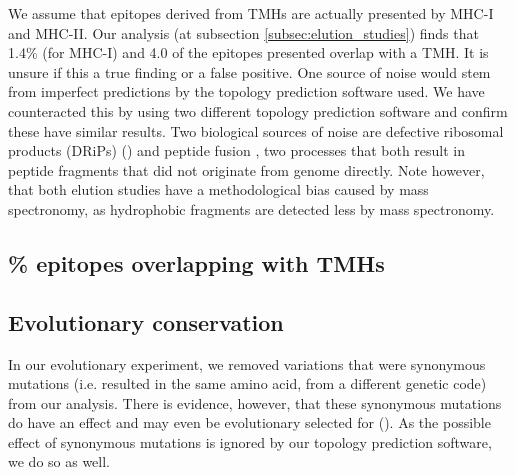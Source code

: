 We assume that epitopes 
derived from TMHs are actually presented by MHC-I and MHC-II.
Our analysis (at subsection \ref{subsec:elution_studies}) 
finds that 1.4\% (for MHC-I) and 4.0%
of the epitopes presented 
overlap with a TMH.
It is unsure if this a true finding or a false positive.
One source of noise would stem from imperfect predictions
by the topology prediction software used. 
We have counteracted this by using two different topology prediction
software and confirm these have similar results.
Two biological sources of noise 
are defective ribosomal products (DRiPs) (\cite{yewdell1996defective}) 
and peptide fusion \cite{delong2016pathogenic},
two processes that both result in peptide fragments
that did not originate from genome directly.
Note however, that both elution studies have a
methodological bias caused by mass spectronomy,
as hydrophobic fragments are detected less 
by mass spectronomy.

\subsection{\% epitopes overlapping with TMHs}

\subsection{Evolutionary conservation}

%
In our evolutionary experiment, 
we removed variations that were synonymous mutations (i.e.
resulted in the same amino acid, from a different genetic code) 
from our analysis.
There is evidence, however, that these synonymous mutations
do have an effect and may even be evolutionary selected 
for (\cite{hunt2009silent}).
As the possible effect of synonymous mutations is ignored by our
topology prediction software, we do so as well.




